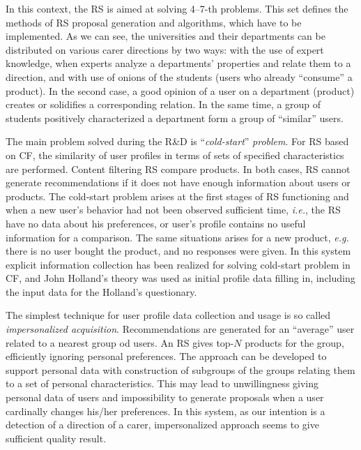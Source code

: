 \documentclass[conference,a4]{IEEEtran}
\begin{document}
In this context, the RS is aimed at solving 4--7-th problems.  This set defines the methods of RS proposal generation and algorithms, which have to be implemented.  As we can see, the universities and their departments can be distributed on various carer directions by two ways: with the use of expert knowledge, when experts analyze a departments' properties and relate them to a direction, and with use of onions of the students (users who already ``consume'' a product).  In the second case, a good opinion of a user on a department (product) creates or solidifies a corresponding relation.  In the same time, a group of students positively characterized a department form a group of ``similar'' users.  %

The main problem solved during the R\&D is ``\emph{cold-start}'' \emph{problem}.  For RS based on CF, the similarity of user profiles in terms of sets of specified characteristics are performed. Content filtering RS compare products. In both cases, RS cannot generate recommendations if it does not have enough information about users or products.  The cold-start problem arises at the first stages of RS functioning and when a new user's behavior had not been observed sufficient time, \emph{i.e.}, the RS have no data about his preferences, or user's profile contains no useful information for a comparison.  The same situations arises for a new product, \emph{e.g.} there is no user bought the product, and no responses were given.  In this system explicit information collection has been realized for solving cold-start problem in CF, and John Holland's theory was used as initial profile data filling in, including the input data for the Holland's questionary.

The simplest technique for user profile data collection and usage is so called \emph{impersonalized acquisition}.  Recommendations are generated for an ``average'' user related to a nearest group od users.  An RS gives top-$N$ products for the group, efficiently ignoring personal preferences.  The approach can be developed to support personal data with construction of subgroups of the groups relating them to a set of personal characteristics.  This may lead to unwillingness giving personal data of users and impossibility to generate proposals when a user cardinally changes his/her preferences.  In this system, as our intention is a detection of a direction of a carer, impersonalized approach seems to give sufficient quality result.
\end{document}
